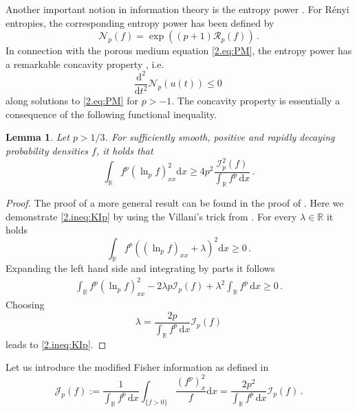\documentclass[12pt]{amsart}
\newcommand{\R}{{\mathbb R}}
\newcommand{\renyi}{{\mathcal{R}}}
\newcommand{\dd}{{\mathrm{d}}}
\newcommand{\J}{\mathcal{J}}
\newcommand{\I}{\mathcal{I}}
\newcommand{\renep}{\mathcal{N}}
\theoremstyle{plain}
\newtheorem{lemma}[theorem]{Lemma}
\theoremstyle{definition}
\theoremstyle{remark}
\begin{document}
Another important notion in information theory is the entropy power \cite{Sha48}. For R\'enyi entropies, the corresponding entropy power has been defined by \cite{SaTo14}
\begin{equation*}
    \renep_p(f) = \exp\left({(p+1)\renyi_p(f)}\right)\,.
\end{equation*} 
In connection with the porous medium equation \eqref{2.eq:PM}, the entropy power has a remarkable concavity property \cite{SaTo14}, i.e.
\begin{equation*}
    \frac{\dd^2}{\dd t^2}\renep_p(u(t)) \leq 0\,
\end{equation*}
along solutions to \eqref{2.eq:PM} for $p>-1$. The concavity property is essentially a consequence of the following functional inequality.
\begin{lemma}\label{2.lem:villp}Let $p>1/3$. 
For sufficiently smooth, positive and rapidly decaying probability densities $f$, it holds that
    \begin{equation}\label{2.ineq:KIp}
        \int_{\R}f^p\left(\ln_p f\right)_{xx}^2 \dd x\geq 4p^2\frac{\I_p^2(f)}{\int_\R f^p\, \dd x}\,.
    \end{equation}
\end{lemma}
\begin{proof} The proof of a more general result can be found in the proof of \cite[Theorem 1]{SaTo14}. Here we demonstrate \eqref{2.ineq:KIp} by using the Villani's trick from \cite{Vil00}. For every $\lambda\in\R$ it holds
    \begin{equation*}
        \int_\R f^p\left(\left(\ln_p f\right)_{xx} + \lambda\right)^2\dd x \geq0\,.
    \end{equation*}
    Expanding the left hand side and integrating by parts it follows
    \begin{align*}
         \int_{\R}f^p\left(\ln_p f\right)_{xx}^2 - 2\lambda p\I_p(f) + \lambda^2 \int_\R f^p\, \dd x \geq 0\,.
    \end{align*}
    Choosing 
    \begin{equation*}
        \lambda = \frac{2p}{\int_\R f^p\, \dd x}\I_p(f)
    \end{equation*}
    leads to \eqref{2.ineq:KIp}.
\end{proof}
Let us introduce the modified Fisher information as defined in \cite{CaTo14}
\begin{equation}\label{2.def:modF}
    \J_p(f) :=\frac{1}{\int_{\R}f^p\,\dd x}\int_{\{f>0\}}\frac{(f^p)_x^2}{f}\dd x = \frac{2p^2}{\int_\R f^p\, \dd x}\I_p(f)\,.
\end{equation}
\end{document}
